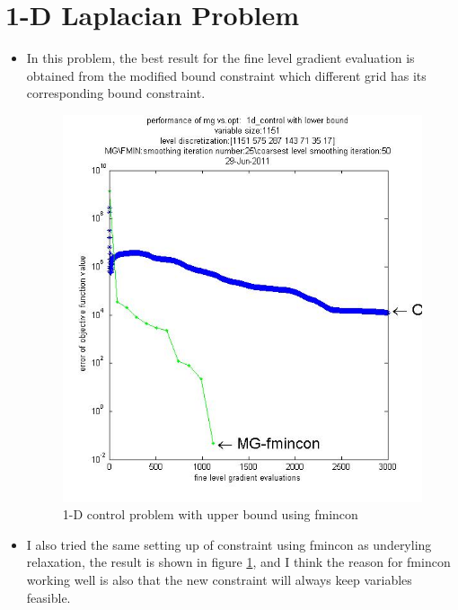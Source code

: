 \documentclass[10pt]{article}
\begin{document}
\section{1-D Laplacian Problem}
\begin{itemize}
\item In this problem, the best result for the fine level gradient evaluation is obtained from the modified bound constraint which different grid has its corresponding bound constraint.

\begin{figure}[h]
\centering
  \includegraphics[width=1\textwidth]{plot1sfmin1151.jpg}
  \caption{1-D control problem with upper bound using fmincon}
\label{fig:1dcontroll}
\end{figure}

\item I also tried the same setting up of constraint using fmincon as underyling relaxation, the result is shown in figure \ref{fig:1dcontroll}, and I think the reason for fmincon working well is also that the new constraint will always keep variables feasible.


\end{itemize}
\end{document}
